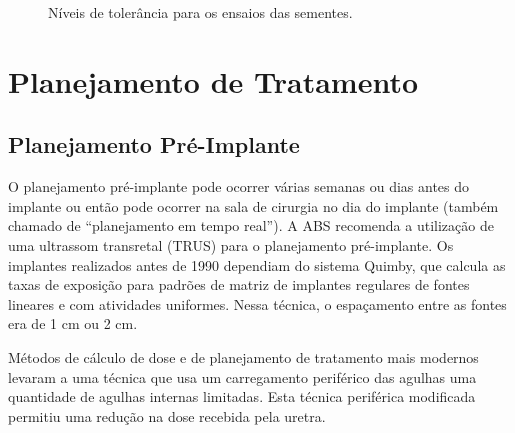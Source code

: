 \documentclass[11pt,a4paper]{article}
\begin{document}
	\begin{figure}[h]
		\centering
		\caption{Níveis de tolerância para os ensaios das sementes.}
		\label{fig:niveisAcaoAssay}
	\end{figure}

	
\section{Planejamento de Tratamento}

\subsection*{Planejamento Pré-Implante}

	O planejamento pré-implante pode ocorrer várias semanas ou dias antes do implante ou  então pode ocorrer na sala de cirurgia no dia do implante (também chamado de “planejamento em tempo real”). A ABS recomenda a utilização de uma ultrassom transretal (TRUS) para o planejamento pré-implante. Os implantes realizados antes de 1990 dependiam do sistema Quimby, que calcula as taxas de exposição para padrões de matriz de implantes regulares de fontes lineares e com atividades uniformes. Nessa técnica, o espaçamento entre as fontes era de 1 cm ou 2 cm. 

	Métodos de cálculo de dose e de planejamento de tratamento mais modernos levaram a uma técnica que usa um carregamento periférico das agulhas uma quantidade de agulhas internas limitadas. Esta técnica periférica modificada permitiu uma redução na dose recebida pela uretra.
\end{document}
